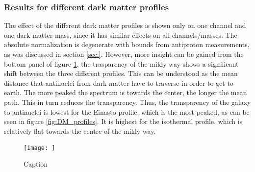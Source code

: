 \subsubsection{Results for different dark matter profiles}\label{sec:ResDMProfiles}
The effect of the different dark matter profiles is shown only on one channel and one dark matter mass, since it has similar effects on all channels/masses. The absolute normalization is degenerate with bounds from antiproton measurements, as was discussed in section \ref{sec:}. However, more insight can be gained from the bottom panel of figure \ref{fig:different_DM_profiles_and_transparencies}, the trasparency of the mikly way shows a significant shift between the three different profiles. This can be understood as the mean distance that antinuclei from dark matter have to traverse in order to get to earth. The more peaked the spectrum is towards the center, the longer the mean path. This in turn reduces the transparency. Thus, the transparency of the galaxy to antinuclei is lowest for the Einasto profile, which is the most peaked, as can be seen in figure \ref{fig:DM_profiles}. It is highest for the isothermal profile, which is relatively flat towards the centre of the mikly way. 

\begin{figure}
    \centering
    \texttt{[image: ]}
    \caption{Caption}
    \label{fig:different_DM_profiles_and_transparencies}
\end{figure}


